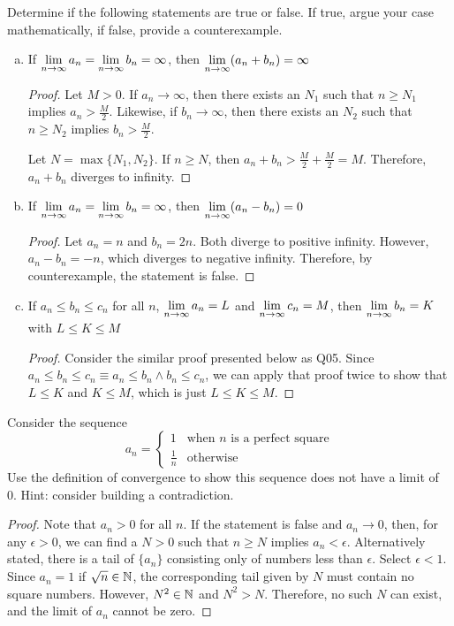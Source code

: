 \question Determine if the following statements are true or false.
If true, argue your case mathematically, if false, provide a counterexample.

\begin{enumerate}[(a)]

  \item If $\displaystyle\lim_{n\to\infty}a_n=\displaystyle\lim_{n\to\infty}b_n=\infty$, then $\displaystyle\lim_{n\to\infty}(a_n+b_n)=\infty$
        \begin{proof}
          Let $M>0$. If $a_n\to\infty$, then there exists an $N_1$ such that $n\geq N_1$ implies $a_n>\frac{M}{2}$. Likewise, if $b_n\to\infty$, then there exists an $N_2$ such that $n\geq N_2$ implies $b_n>\frac{M}{2}$.

          Let $N=\max \{N_1,N_2\}$. If $n\geq N$, then $a_n+b_n>\frac{M}{2}+\frac{M}{2}=M$.
          Therefore, $a_n+b_n$ diverges to infinity.
        \end{proof}

  \item If $\displaystyle\lim_{n\to\infty}a_n=\displaystyle\lim_{n\to\infty}b_n=\infty$, then $\displaystyle\lim_{n\to\infty}(a_n-b_n)=0$
        \begin{proof}
          Let $a_n=n$ and $b_n=2n$. Both diverge to positive infinity. However, $a_n-b_n=-n$, which diverges to negative infinity. Therefore, by counterexample, the statement is false.
        \end{proof}

  \item If $a_n \leq b_n \leq c_n$ for all $n$, $\displaystyle\lim_{n\to\infty}a_n=L$ and $\displaystyle\lim_{n\to\infty}c_n=M$, then $\displaystyle\lim_{n\to\infty}b_n=K$ with $L \leq K \leq M$
        \begin{proof}
          Consider the similar proof presented below as Q05.
          Since $a_n \leq b_n \leq c_n \equiv a_n \leq b_n \land b_n \leq c_n$, we can apply that proof twice to show that $L \leq K$ and $K \leq M$, which is just $L \leq K \leq M$.
        \end{proof}

\end{enumerate}



\question
Consider the sequence
\[
  a_n=\begin{cases}
    1           & \textrm{when $n$ is a perfect square} \\
    \frac{1}{n} & \textrm{otherwise}
  \end{cases}
\]
Use the definition of convergence to show this sequence does not have a limit of 0. Hint: consider building a contradiction.
\begin{proof}
  Note that $a_n>0$ for all $n$.
  If the statement is false and $a_n\to 0$, then, for any $\epsilon>0$, we can find a $N>0$ such that $n\geq N$ implies $a_n<\epsilon$.
  Alternatively stated, there is a tail of $\{a_n\}$ consisting only of numbers less than $\epsilon$.
  Select $\epsilon<1$. Since $a_n=1$ if $\sqrt{n}\in\mathbb{N}$, the corresponding tail given by $N$ must contain no square numbers.
  However, $N^2\in\mathbb{N}$ and $N^2>N$. Therefore, no such $N$ can exist, and the limit of $a_n$ cannot be zero.
\end{proof}



